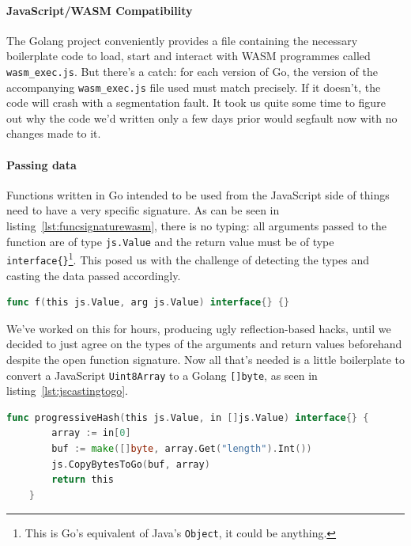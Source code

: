 \paragraph{JavaScript/WASM Compatibility} The Golang project conveniently provides a file containing the necessary boilerplate code to load, start and interact with \gls{WASM} programmes called \texttt{wasm\_exec.js}.
But there's a catch: for each version of Go, the version of the accompanying \texttt{wasm\_exec.js} file used must match precisely.
If it doesn't, the code will crash with a segmentation fault.
It took us quite some time to figure out why the code we'd written only a few days prior would segfault now with no changes made to it.

\paragraph{Passing data} Functions written in Go intended to be used from the JavaScript side of things need to have a very specific signature.
As can be seen in listing~\ref{lst:funcsignaturewasm}, there is no typing: all arguments passed to the function are of type \texttt{js.Value} and the return value must be of type \texttt{interface\{\}}\footnote{This is Go's equivalent of Java's \texttt{Object}, it could be anything.}.
This posed us with the challenge of detecting the types and casting the data passed accordingly.

\begin{lstlisting}[caption={Golang WASM function signature}, captionpos=b, language=Go, label={lst:funcsignaturewasm}]
    func f(this js.Value, arg js.Value) interface{} {}
\end{lstlisting}

We've worked on this for hours, producing ugly reflection-based hacks, until we decided to just agree on the types of the arguments and return values beforehand despite the open function signature.
Now all that's needed is a little boilerplate to convert a JavaScript \texttt{Uint8Array} to a Golang \texttt{[]byte}, as seen in listing~\ref{lst:jscastingtogo}.

\begin{lstlisting}[caption={Uint8Array to {[]}byte}, captionpos=b, language=Go, label={lst:jscastingtogo}, captionpos=b]
    func progressiveHash(this js.Value, in []js.Value) interface{} {
        array := in[0]
        buf := make([]byte, array.Get("length").Int())
        js.CopyBytesToGo(buf, array)
        return this
    }
\end{lstlisting}

